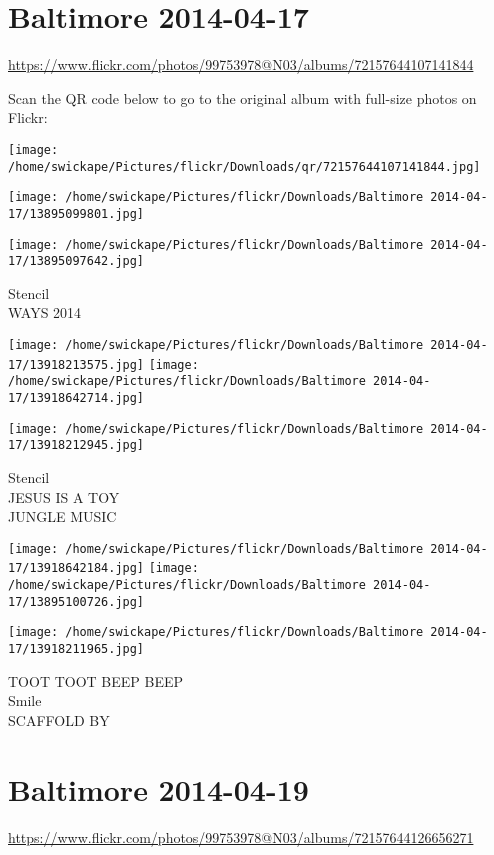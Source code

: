 \documentclass[10pt,letterpaper]{article}
\title{}
\author{}
\date{}
\begin{document}
\section*{Baltimore 2014-04-17}

\url{https://www.flickr.com/photos/99753978@N03/albums/72157644107141844}

Scan the QR code below to go to the original album with full-size photos on Flickr:

\texttt{[image: /home/swickape/Pictures/flickr/Downloads/qr/72157644107141844.jpg]}
\pagebreak

\texttt{[image: /home/swickape/Pictures/flickr/Downloads/Baltimore 2014-04-17/13895099801.jpg]}

\vspace{0.25in}
\texttt{[image: /home/swickape/Pictures/flickr/Downloads/Baltimore 2014-04-17/13895097642.jpg]}

Stencil\\
WAYS 2014
\pagebreak

\texttt{[image: /home/swickape/Pictures/flickr/Downloads/Baltimore 2014-04-17/13918213575.jpg]}
\texttt{[image: /home/swickape/Pictures/flickr/Downloads/Baltimore 2014-04-17/13918642714.jpg]}

\vspace{0.25in}
\texttt{[image: /home/swickape/Pictures/flickr/Downloads/Baltimore 2014-04-17/13918212945.jpg]}

Stencil\\
JESUS IS A TOY\\
JUNGLE MUSIC
\pagebreak

\texttt{[image: /home/swickape/Pictures/flickr/Downloads/Baltimore 2014-04-17/13918642184.jpg]}
\texttt{[image: /home/swickape/Pictures/flickr/Downloads/Baltimore 2014-04-17/13895100726.jpg]}

\texttt{[image: /home/swickape/Pictures/flickr/Downloads/Baltimore 2014-04-17/13918211965.jpg]}

TOOT TOOT BEEP BEEP\\
Smile\\
SCAFFOLD BY
\pagebreak

\section*{Baltimore 2014-04-19}

\url{https://www.flickr.com/photos/99753978@N03/albums/72157644126656271}
\end{document}
